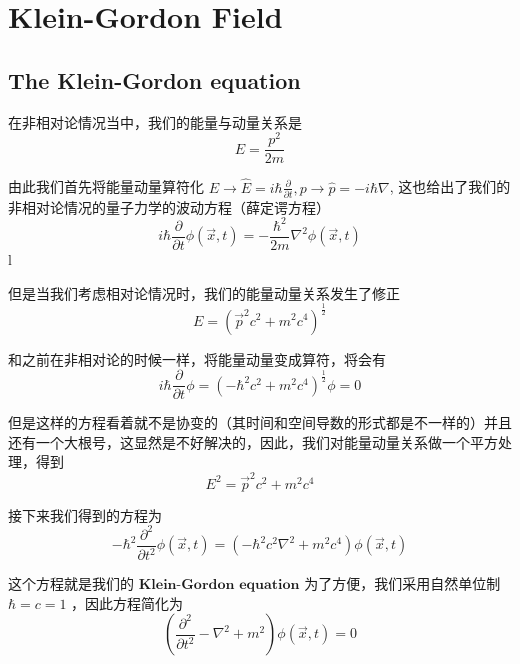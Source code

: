 \documentclass{article}
\begin{document}
\section{Klein-Gordon Field}

\subsection{The Klein-Gordon equation}
在非相对论情况当中，我们的能量与动量关系是 
\begin{equation*}
    E = \frac{p^2}{2m}
\end{equation*}

由此我们首先将能量动量算符化 $\displaystyle E\to\hat{E} = i\hbar\frac{\partial}{\partial t},p\to\hat{p} = -i\hbar\nabla$, 这也给出了我们的非相对论情况的量子力学的波动方程（薛定谔方程）
\begin{equation*}
    i\hbar\frac{\partial}{\partial t} \phi(\vec{x},t) = -\frac{\hbar^2}{2m} \nabla^2 \phi(\vec{x},t)
\end{equation*} l

但是当我们考虑相对论情况时，我们的能量动量关系发生了修正
\begin{equation*}
    E = \left(\vec{p}^2c^2 + m^2 c^4\right)^{\frac{1}{2}}
\end{equation*}

和之前在非相对论的时候一样，将能量动量变成算符，将会有
\begin{equation*}
    i\hbar \frac{\partial}{\partial t}\phi = \left(-\hbar^2c^2 + m^2 c^4\right)^{\frac{1}{2}} \phi = 0
\end{equation*}

但是这样的方程看着就不是协变的（其时间和空间导数的形式都是不一样的）并且还有一个大根号，这显然是不好解决的，因此，我们对能量动量关系做一个平方处理，得到 
\begin{equation*}
    E^2 = \vec{p}^2c^2 + m^2c^4
\end{equation*}

接下来我们得到的方程为
\begin{equation*}
    -\hbar^2\frac{\partial^2}{\partial t^2} \phi(\vec{x},t) = \left(-\hbar^2c^2\nabla^2 + m^2 c^4 \right)\phi(\vec{x},t)
\end{equation*}

这个方程就是我们的 $\textbf{Klein-Gordon equation}$ 为了方便，我们采用自然单位制 $\hbar = c = 1$ ，因此方程简化为
\begin{equation*}
    \left(\frac{\partial^2}{\partial t^2} - \nabla^2 +m^2\right)\phi(\vec{x},t) = 0
\end{equation*}
\end{document}
